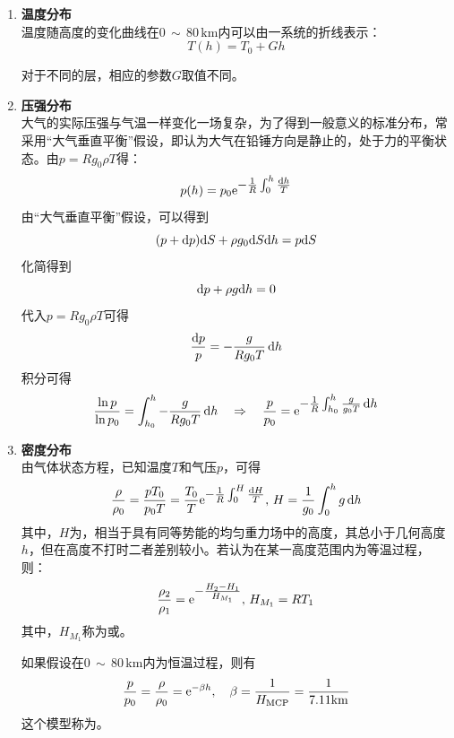 \begin{enumerate}
	\item \textbf{温度分布}\\
	\hspace*{2em}温度随高度的变化曲线在$0 \, \sim \, 80 \, \text{km}$内可以由一系统的折线表示：
	\begin{equation}
		T(h) = T_0 + Gh
	\end{equation}
	
	对于不同的层，相应的参数$G$取值不同。
	
	\item \textbf{压强分布}\\
	\hspace*{2em}大气的实际压强与气温一样变化一场复杂，为了得到一般意义的标准分布，常采用“大气垂直平衡”假设，即认为大气在铅锤方向是静止的，处于力的平衡状态。由$p=Rg_0\rho T$得：
	\begin{equation}
		p(h) = p_0 {\rm{e}}^{\textstyle - \frac{1}{R}\int_0^h \frac{{\rm{d}} h}{T}}
	\end{equation}
	\proof 由“大气垂直平衡”假设，可以得到
	\begin{equation*}
		(p + {\rm{d}} p){\rm{d}} S + \rho g_0 {\rm{d}} S {\rm{d}} h = p {\rm{d}} S
	\end{equation*}
	化简得到
	\begin{equation*}
		{\rm{d}} p + \rho g {\rm{d}} h = 0
	\end{equation*}
	代入$p=Rg_0\rho T$可得
	\begin{equation*}
		\dfrac{{\rm{d}} p}{p} = - \dfrac{g}{Rg_0T}\, {\rm{d}} h
	\end{equation*}
	积分可得
	\begin{equation}
		\frac{\ln p}{\ln p_0} = \int_{h_0}^h - \frac{g}{Rg_0T}\, {\rm{d}} h \quad \Rightarrow \quad \frac{p}{p_0} = {\rm{e}}^{\textstyle - \frac{1}{R}\int_{h_0}^h \frac{g}{g_0 T}\, {\rm{d}} h}
	\end{equation}
	\item \textbf{密度分布}\\
	\hspace*{2em}由气体状态方程，已知温度$T$和气压$p$，可得
	\begin{equation}
		\dfrac{\rho}{\rho_0} = \frac{pT_0}{p_0 T} = \frac{T_0}{T} {\rm{e}} ^{\textstyle -\frac{1}{R}\int_0^H \frac{{\rm{d}} H}{T}},\, H = \dfrac{1}{g_0}\int_0^h g \, {\rm{d}} h
	\end{equation}
	其中，$H$为，相当于具有同等势能的均匀重力场中的高度，其总小于几何高度$h$，但在高度不打时二者差别较小。若认为在某一高度范围内为等温过程，则：
	\begin{equation}
		\dfrac{\rho_2}{\rho_1} = {\rm{e}}^{\textstyle - \frac{H_2 - H_1}{H_{M_1}}}, \, H_{M_1} = RT_1
	\end{equation}
	其中，$H_{M_1}$称为或。
	
	\hspace*{2em} 如果假设在$0 \, \sim \, 80\, \text{km}$内为恒温过程，则有
	\begin{equation}
		\frac{p}{p_0} = \dfrac{\rho}{\rho_0} = {\rm{e}}^{-\beta h}, \quad \beta = \frac{1}{H_{\text{MCP}}}=\frac{1}{7.11\text{km}}
	\end{equation}
	这个模型称为。
\end{enumerate}

